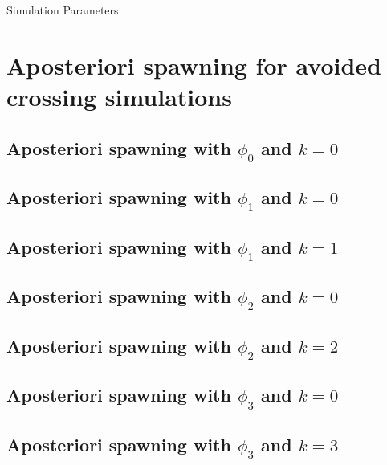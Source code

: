\begin{chapter}{Simulation Parameters}
\FloatBarrier
\section{Aposteriori spawning for avoided crossing simulations}
\label{cfg:delta_gap_apost}

\subsection{Aposteriori spawning with $\phi_0$ and $k=0$}
\label{cfg:delta_gap_apost_phi0_k0}

\subsection{Aposteriori spawning with $\phi_1$ and $k=0$}
\label{cfg:delta_gap_apost_phi1_k0}
\subsection{Aposteriori spawning with $\phi_1$ and $k=1$}
\label{cfg:delta_gap_apost_phi1_k1}

\subsection{Aposteriori spawning with $\phi_2$ and $k=0$}
\label{cfg:delta_gap_apost_phi2_k0}
\subsection{Aposteriori spawning with $\phi_2$ and $k=2$}
\label{cfg:delta_gap_apost_phi2_k2}

\subsection{Aposteriori spawning with $\phi_3$ and $k=0$}
\label{cfg:delta_gap_apost_phi3_k0}
\subsection{Aposteriori spawning with $\phi_3$ and $k=3$}
\label{cfg:delta_gap_apost_phi3_k3}


\end{chapter}
